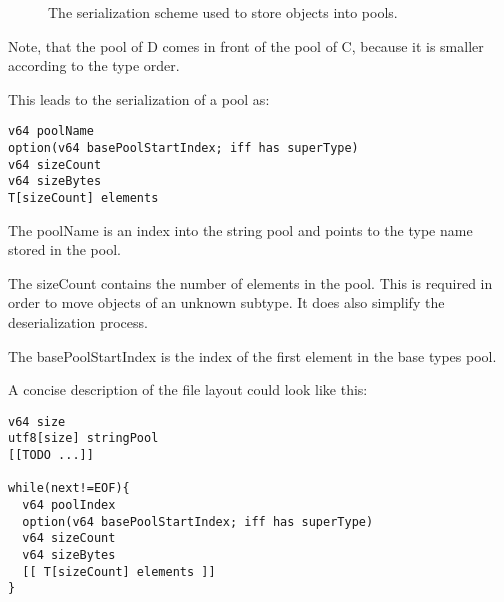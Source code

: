 \begin{figure}[h]
\caption{The serialization scheme used to store objects into pools.}
\end{figure}

Note, that the pool of D comes in front of the pool of C, because it is smaller according to the type order.

This leads to the serialization of a pool as:
\begin{verbatim}
v64 poolName
option(v64 basePoolStartIndex; iff has superType)
v64 sizeCount
v64 sizeBytes
T[sizeCount] elements
\end{verbatim}

The poolName is an index into the string pool and points to the type name stored in the pool.

The sizeCount contains the number of elements in the pool. This is required in order to move objects of an unknown subtype. It does also simplify the deserialization process.

The basePoolStartIndex is the index of the first element in the base types pool.



A concise description of the file layout could look like this:
\begin{verbatim}
v64 size
utf8[size] stringPool
[[TODO ...]]

while(next!=EOF){
  v64 poolIndex
  option(v64 basePoolStartIndex; iff has superType)
  v64 sizeCount
  v64 sizeBytes
  [[ T[sizeCount] elements ]]
}
\end{verbatim}

